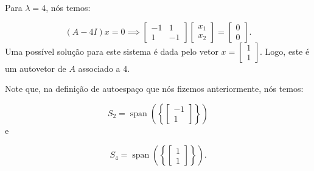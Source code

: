 \begin{Example}
	Para $\lambda = 4$, nós temos:
	
	$$
	(A - 4I)x = 0 \implies \begin{bmatrix}
		-1 & 1 \\
		1 & -1
	\end{bmatrix}\begin{bmatrix}
		x_1 \\
		x_2
	\end{bmatrix} = \begin{bmatrix}
		0 \\
		0
	\end{bmatrix}.
	$$
	Uma possível solução para este sistema é dada pelo vetor $x = \begin{bmatrix}
		1 \\
		1
	\end{bmatrix}$. Logo, este é um autovetor de $A$ associado a $4$.
	
	Note que, na definição de autoespaço que nós fizemos anteriormente, nós temos:
	
	$$
	S_2 = \operatorname{span}\left(\left\{\begin{bmatrix}
		-1 \\
		1
	\end{bmatrix}\right\}\right)
	$$
	e
	
	$$
	S_4 = \operatorname{span}\left(\left\{\begin{bmatrix}
		1 \\
		1
	\end{bmatrix}\right\}\right).
	$$
\end{Example}

